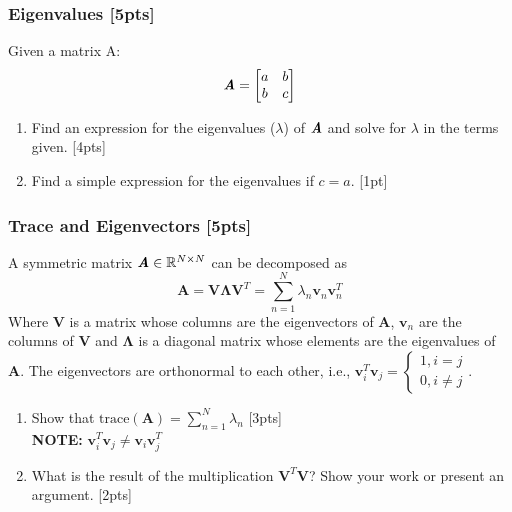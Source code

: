 \documentclass{article}
\begin{document}
\subsubsection{Eigenvalues [5pts]}
Given a matrix A:
$$\textbf{\textit{A}}=\begin{bmatrix}
    a & b \\
    b & c
\end{bmatrix}$$
\begin{enumerate}[label=(\alph*)]
    \item Find an expression for the eigenvalues ($\lambda$) of $\textbf{\textit{A}}$ and solve for $\lambda$ in the terms given. [4pts]
    
    \item Find a simple expression for the eigenvalues if $c= a$. [1pt]
\end{enumerate}


\newpage
\subsubsection{Trace and Eigenvectors [5pts]}
A symmetric matrix $\textbf{\textit{A}}\in \mathbb{R}^{N\times N}$ can be decomposed as
$$\boldsymbol{A}=\boldsymbol{V} \boldsymbol{\Lambda } \boldsymbol{V}^T=\sum_{n=1}^N \lambda_n \boldsymbol{v}_n \boldsymbol{v}_n^T$$
Where $\boldsymbol{V}$ is a matrix whose columns are the eigenvectors of $\boldsymbol{A}$, $\boldsymbol{v}_n$ are the columns of $\boldsymbol{V}$ and $\boldsymbol{\Lambda}$ is a diagonal matrix whose elements are the eigenvalues of $\boldsymbol{A}$. The eigenvectors are orthonormal to each other, i.e., $\boldsymbol{v}_i^T\boldsymbol{v}_j=\left\{
\begin{matrix}
    1, i=j \\
    0, i\neq j
\end{matrix}\right.$.
\begin{enumerate}[label=(\alph*)]
    \item Show that $\text{trace}(\boldsymbol{A})=\sum_{n=1}^N \lambda_n$ [3pts] \\
    \textbf{NOTE:} $\boldsymbol{v}_i^T\boldsymbol{v}_j\neq \boldsymbol{v}_i\boldsymbol{v}_j^T$
    
    \item What is the result of the multiplication $\boldsymbol{V}^T \boldsymbol{V}$? Show your work or present an argument. [2pts]\\
\end{enumerate}


\newpage
\end{document}
